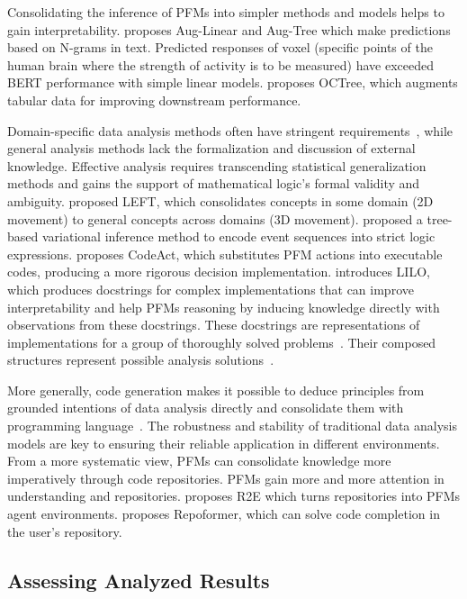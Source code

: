   Consolidating the inference of PFMs into simpler methods and models helps to gain interpretability. \cite{singh2023augmenting} proposes Aug-Linear and Aug-Tree which make predictions based on N-grams in text. Predicted responses of voxel (specific points of the human brain where the strength of activity is to be measured) have exceeded BERT performance with simple linear models. \cite{nam2024optimized} proposes OCTree, which augments tabular data for improving downstream performance. 
  
  Domain-specific data analysis methods often have stringent requirements~\cite{020arlot2010survey}, while general analysis methods lack the formalization and discussion of external knowledge. Effective analysis requires transcending statistical generalization methods and gains the support of mathematical logic's formal validity and ambiguity. \cite{HsuMTW23} proposed LEFT, which consolidates concepts in some domain (2D movement) to general concepts across domains (3D movement). \cite{SongY00024} proposed a tree-based variational inference method to encode event sequences into strict logic expressions. \cite{WangCY0L0J24} proposes CodeAct, which substitutes PFM actions into executable codes, producing a more rigorous decision implementation. \cite{GrandWBOLTA24} introduces LILO, which produces docstrings for complex implementations that can improve interpretability and help PFMs reasoning by inducing knowledge directly with observations from these docstrings. These docstrings are representations of implementations for a group of thoroughly solved problems~\cite{yuan2023power}. Their composed structures represent possible analysis solutions~\cite{zhengprise}.
  
  More generally, code generation makes it possible to deduce principles from grounded intentions of data analysis directly and consolidate them with programming language~\cite{KoziolekGHALE24}. The robustness and stability of traditional data analysis models are key to ensuring their reliable application in different environments. From a more systematic view, PFMs can consolidate knowledge more imperatively through code repositories. PFMs gain more and more attention in understanding and repositories. \cite{jain2024r2e} proposes R2E which turns repositories into PFMs agent environments. \cite{repocomp} proposes Repoformer, which can solve code completion in the user's repository. 
  
  
  \subsection{Assessing Analyzed Results} \label{sec:correctness}
  
